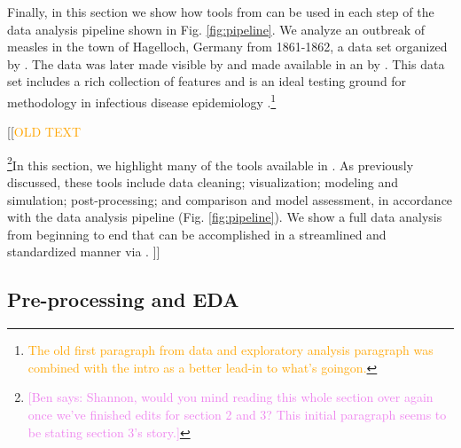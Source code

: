 \documentclass[
  shortnames]{jss}
\begin{document}
Finally, in this section we show how tools from  can be
used in each step of the data analysis pipeline shown in Fig.
\ref{fig:pipeline}. We analyze an outbreak of measles in the town of
Hagelloch, Germany from 1861-1862, a data set organized by
\cite{pfeilsticker1863}. The data was later made visible by
\cite{oesterle1992} and made available in an  by
\cite{surveillance2017}. This data set includes a rich collection of
features and is an ideal testing ground for methodology in infectious
disease epidemiology
\cite{Neal2004,britton2011,groendyke2012,becker2016}.\footnote{\textcolor{orange}{The old first paragraph from data and exploratory analysis paragraph was combined with the intro as a better lead-in to what's goingon.}}

{[}{[}\textcolor{orange}{OLD TEXT}

\footnote{\textcolor{violet}{[Ben says: Shannon, would you mind reading this whole section over again once we've finished edits for section 2 and 3? This initial paragraph seems to be stating section 3's story.]}}In
this section, we highlight many of the tools available in
. As previously discussed, these tools include data
cleaning; visualization; modeling and simulation; post-processing; and
comparison and model assessment, in accordance with the data analysis
pipeline (Fig. \ref{fig:pipeline}). We show a full data analysis from
beginning to end that can be accomplished in a streamlined and
standardized manner via . {]}{]}

\subsection{Pre-processing and EDA}
\end{document}
